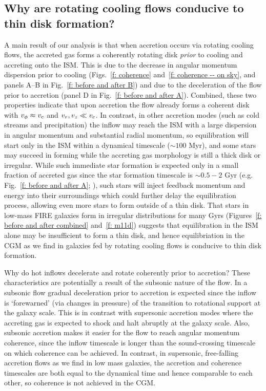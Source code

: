 \documentclass[fleqn,usenatbib]{mnras}
\begin{document}
\subsection{Why are rotating cooling flows conducive to thin disk formation?}
\label{s: why CFs thin disks}

A main result of our analysis is that when accretion occurs via rotating cooling flows, the accreted gas forms a coherently rotating disk \textit{prior} to cooling and accreting onto the ISM.
This is due to the decrease in angular momentum dispersion prior to cooling (Figs.~\ref{f: coherence} and~\ref{f: coherence -- on sky}, and panels A--B in Fig.~\ref{f: before and after B}) and due to the deceleration of the flow prior to accretion (panel D in Fig.~\ref{f: before and after A}).
Combined, these two properties indicate that upon accretion the flow already forms a coherent disk with $v_\phi\approx v_{\rm c}$ and $v_r, v_z \ll v_{\rm c}$.
In contrast, in other accretion modes (such as cold streams and precipitation) the inflow may reach the ISM with a large dispersion in angular momentum and substantial radial momentum, so equilibration will start only in the ISM within a dynamical timescale ($\sim 100$ Myr), and some stars may succeed in forming while the accreting gas morphology is still a thick disk or irregular.
While such immediate star formation is expected only in a small fraction of accreted gas since the star formation timescale is $\sim0.5-2$ Gyr (e.g. Fig.~\ref{f: before and after A}; \citealt{Bigiel2008}), such stars will inject feedback momentum and energy into their surroundings which could further delay the equilibration process, allowing even more stars to form outside of a thin disk.
That stars in low-mass FIRE galaxies form in irregular distributions for many Gyrs (Figures~\ref{f: before and after combined} and~\ref{f: m11d}) suggests that equilibration in the ISM alone may be insufficient to form a thin disk, and hence equilibriation in the CGM as we find in galaxies fed by rotating cooling flows is conducive to thin disk formation. 

Why do hot inflows decelerate and rotate coherently prior to accretion?
These characteristics are potentially a result of the subsonic nature of the flow. 
In a subsonic flow gradual deceleration prior to accretion is expected since the inflow is `forewarned' (via changes in pressure) of the transition to rotational support at the galaxy scale.
This is in contrast with supersonic accretion modes where the accreting gas is expected to shock and halt abruptly at the galaxy scale.
Also, subsonic accretion makes it easier for the flow to reach angular momentum coherence, since the inflow timescale is longer than the sound-crossing timescale on which coherence can be achieved. In contrast, in supersonic, free-falling accretion flows as we find in low mass galaxies, the accretion and coherence timescales are both equal to the dynamical time and hence comparable to each other, so coherence is not achieved in the CGM.
\end{document}
